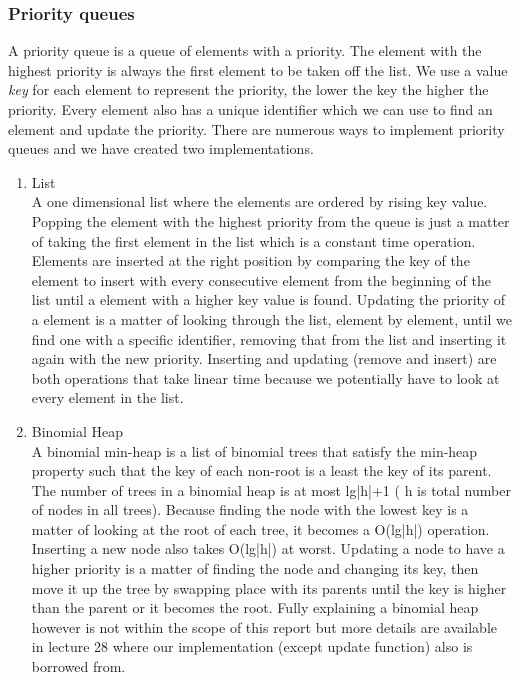 \documentclass[12pt, a4paper]{article}
\begin{document}


\subsubsection{Priority queues}
\label{Priority queues}

A priority queue is a queue of elements with a priority. The element with the highest priority is always the first element to be taken off the list. We use a value \textit{key} for each element to represent the priority, the lower the key the higher the priority. Every element also has a unique identifier which we can use to find an element and update the priority.  There are numerous ways to implement priority queues and we have created two implementations.

\begin{enumerate}
\item{List}\\
A one dimensional list where the elements are ordered by rising key value. Popping the element with the highest priority from the queue is just a matter of taking the first element in the list which is a constant time operation. Elements are inserted at the right position by comparing the key of the element to insert with every consecutive element from the beginning of the list until a element with a higher key value is found. Updating the priority of a element is a matter of looking through the list, element by element, until we find one with a specific identifier, removing that from the list and inserting it again with the new priority. Inserting and updating (remove and insert) are both operations that take linear time because we potentially have to look at every element in the list.

\item{Binomial Heap}\\
A binomial min-heap is a list of binomial trees that satisfy the min-heap property such that the key of each non-root is a least the key of its parent. The number of trees in a binomial heap is at most lg|h|+1 ( h is total number of nodes in all trees). Because finding the node with the lowest key is a matter of looking at the root of each tree, it becomes a O(lg|h|) operation. Inserting a new node also takes O(lg|h|) at worst. Updating a node to have a higher priority is a matter of finding the node and changing its key, then move it up the tree by swapping place with its parents until the key is higher than the parent or it becomes the root. Fully explaining a binomial heap however is not within the scope of this report but more details are available in lecture 28 \cite{lecture28} where our implementation (except update function) also is borrowed from.

\end{enumerate}
\end{document}
